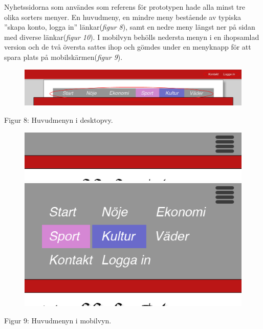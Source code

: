 \documentclass[11pt]{article}
\begin{document}
Nyhetssidorna som användes som referens för prototypen hade alla minst tre olika sorters menyer. En huvudmeny, en mindre meny bestående av typiska ”skapa konto, logga in” länkar(\textit{figur 8}), samt en nedre meny längst ner på sidan med diverse länkar(\textit{figur 10}). I mobilvyn behölls nedersta menyn i en ihopsamlad version och de två översta sattes ihop och gömdes under en menyknapp för att spara plats på mobilskärmen(\textit{figur 9}).
\\

\begin{figure}[H]
\centerline{%
\includegraphics[scale=0.4]{pics/menydesktop.png}\\
}
\end{figure}
\hspace{0.5cm}Figur 8: Huvudmenyn i desktopvy.

\begin{figure}[H]
\centerline{%
\includegraphics[scale=0.6]{pics/menymobil.png}\hspace{2em}%
\includegraphics[scale=0.35]{pics/menymobilopen.png}%
}
\end{figure}
\hspace{0.5cm}Figur 9: Huvudmenyn i mobilvyn.
\end{document}
